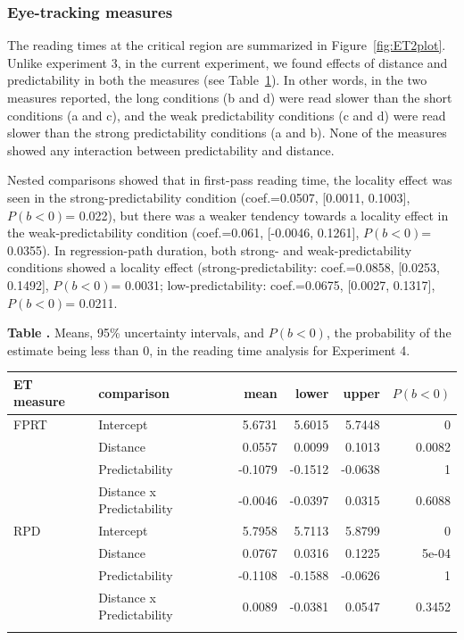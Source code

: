 \documentclass{frontiersSCNS}\usepackage{knitr} %
\begin{document}
\subsubsection{Eye-tracking measures}

The reading times at the critical region are summarized in 
Figure~\ref{fig:ET2plot}.
Unlike experiment 3, in the current experiment, we found effects of distance and predictability in both the measures (see Table~\ref{Tab:04}). In other words, in the two measures reported, the long conditions (b and d) were read slower than the short conditions (a and c), and the weak predictability conditions (c and d) were read slower than the strong predictability conditions (a and b). None of the measures showed any interaction between predictability and distance.

Nested comparisons showed that in first-pass reading time, the locality effect was seen in the strong-predictability condition 
(coef.=0.0507,
[0.0011,
0.1003],
$P(b<0)$= 0.022),
but there was a weaker tendency towards a locality effect in the weak-predictability condition 
(coef.=0.061,
[-0.0046,
0.1261],
$P(b<0)$= 0.0355).
In regression-path duration, both strong- and weak-predictability conditions showed a locality effect (strong-predictability: 
coef.=0.0858,
[0.0253,
0.1492],
$P(b<0)$= 0.0031;
low-predictability: 
coef.=0.0675,
[0.0027,
0.1317],
$P(b<0)$= 0.0211.

\begin{table}[!htbp]
\textbf{\label{Tab:04} Table . }{Means, 95\% uncertainty intervals, and $P(b<0)$, the probability of the estimate being less than 0, in the reading time analysis for Experiment 4.}
\processtable{}
{\begin{tabular}{llrrrr}\toprule
ET measure & comparison & mean & lower & upper & $P(b<0)$ \\
\midrule   
FPRT & Intercept  & 5.6731 & 5.6015 & 5.7448 & 0\\
 & Distance  & 0.0557 & 0.0099 & 0.1013 & 0.0082\\
 & Predictability  & -0.1079 & -0.1512 & -0.0638 & 1\\
 & Distance x Predictability  & -0.0046 & -0.0397 & 0.0315 & 0.6088\\
RPD & Intercept  & 5.7958 & 5.7113 & 5.8799 & 0\\
 & Distance  & 0.0767 & 0.0316 & 0.1225 & 5e-04\\
 & Predictability  & -0.1108 & -0.1588 & -0.0626 & 1\\
 & Distance x Predictability  & 0.0089 & -0.0381 & 0.0547 & 0.3452\\
\botrule
\end{tabular}}{}
\end{table}
\end{document}
